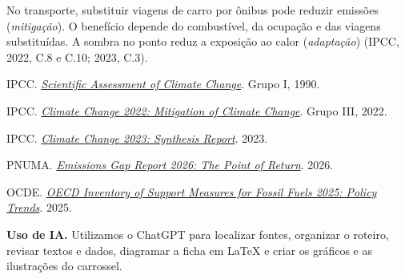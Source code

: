 \documentclass[12pt,oneside,a4paper,brazil]{abntex2}
\newcommand{\bloco}[1]{\par\addvspace{6pt}\noindent{\sffamily\bfseries #1}\par\nobreak}
\begin{document}
No transporte, substituir viagens de carro por ônibus pode reduzir emissões (\textit{mitigação}). O benefício depende do combustível, da ocupação e das viagens substituídas. A sombra no ponto reduz a exposição ao calor (\textit{adaptação}) (IPCC, 2022, C.8 e C.10; 2023, C.3).

\bloco{Referências}
{\small
IPCC. \href{https://www.ipcc.ch/site/assets/uploads/2018/05/ipcc_90_92_assessments_far_wg_I_spm.pdf}{\textit{Scientific Assessment of Climate Change}}. Grupo I, 1990.\par
IPCC. \href{https://www.ipcc.ch/report/ar6/wg3/chapter/summary-for-policymakers/}{\textit{Climate Change 2022: Mitigation of Climate Change}}. Grupo III, 2022.\par
IPCC. \href{https://www.ipcc.ch/report/ar6/syr/summary-for-policymakers/}{\textit{Climate Change 2023: Synthesis Report}}. 2023.\par
PNUMA. \href{https://brasil.un.org/sites/default/files/2026-10/Emissions-Gap-Report-2026.pdf}{\textit{Emissions Gap Report 2026: The Point of Return}}. 2026.\par
OCDE. \href{https://doi.org/10.1787/6fff0cb7-en}{\textit{OECD Inventory of Support Measures for Fossil Fuels 2025: Policy Trends}}. 2025.\par}
\vspace{4pt}
{\small\textbf{Uso de IA.} Utilizamos o ChatGPT para localizar fontes, organizar o roteiro, revisar textos e dados, diagramar a ficha em LaTeX e criar os gráficos e as ilustrações do carrossel.\par}
\end{document}
